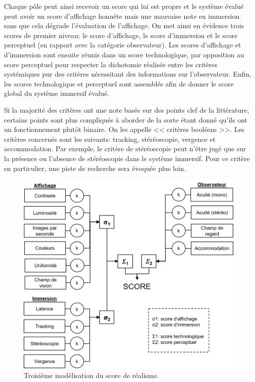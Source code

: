 	\par Chaque pôle peut ainsi recevoir un score qui lui est propre et le système évalué peut avoir un score d'affichage honnête mais une mauvaise note en immersion sans que cela dégrade l'évaluation de l'affichage. On met ainsi en évidence trois scores de premier niveau: le score d'affichage, le score d'immersion et le score perceptuel (en rapport avec la catégorie observateur). Les scores d'affichage et d'immersion sont ensuite réunis dans un score technologique, par opposition au score perceptuel pour respecter la dichotomie réalisée entre les critères systémiques pur des critères nécessitant des informations sur l'observateur. Enfin, les scores technologique et perceptuel sont assemblés afin de donner le score global du système immersif évalué.
	
	\par Si la majorité des critères ont une note basée sur des points clef de la littérature, certains points sont plus compliqués à aborder de la sorte étant donné qu'ils ont un fonctionnement plutôt binaire. On les appelle << critères booléens >>. Les critères concernés sont les suivants: tracking, stéréoscopie, vergence et accommodation. Par exemple, le critère de stéréoscopie peut n'être jugé que sur la présence ou l'absence de stéréoscopie dans le système immersif. Pour ce critère en particulier, une piste de recherche sera évoquée plus loin.
	
	\begin{figure}[h]
		\centering
		\includegraphics[scale=1]{Figures/Modele3_2}
		\caption{Troisième modélisation du score de réalisme.}
		\label{fig:modèle_3}
	\end{figure}
	
